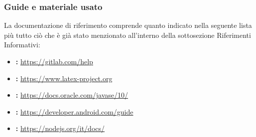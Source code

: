 \subsubsection{Guide e materiale usato}
La documentazione di riferimento comprende quanto indicato nella seguente lista più tutto ciò che è già stato menzionato all’interno della sottosezione Riferimenti Informativi:
\begin{itemize}
    \item \textbf{: }\href{https://gitlab.com/help}{https://gitlab.com/help}
    \item \textbf{: }\href{https://www.latex-project.org}{https://www.latex-project.org}
    \item \textbf{: }\href{https://docs.oracle.com/javase/10/}{https://docs.oracle.com/javase/10/}
    \item \textbf{: }\href{https://developer.android.com/guide}{https://developer.android.com/guide}
    \item \textbf{: }\href{https://nodejs.org/it/docs/}{https://nodejs.org/it/docs/}
\end{itemize}
